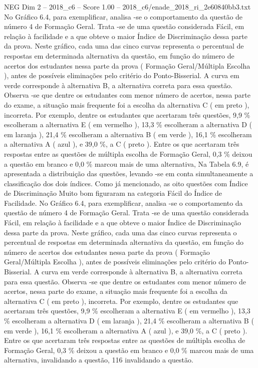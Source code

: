 \begin{textsample}{NEG Dim 2 – 2018\_c6 – Score 1.00 – 2018\_c6/enade\_2018\_ri\_2e60840bb3.txt}
No Gráfico 6.4, para exemplificar, analisa -se o comportamento da questão de número 4 de Formação Geral.
Trata -se de uma questão considerada Fácil, em relação à facilidade e a que obteve o maior Índice de Discriminação dessa parte da prova.
Neste gráfico, cada uma das cinco curvas representa o percentual de respostas em determinada alternativa da questão, em função do número de acertos dos estudantes nessa parte da prova ( Formação Geral/Múltipla Escolha ), antes de possíveis eliminações pelo critério do Ponto-Bisserial.
A curva em verde corresponde à alternativa B, a alternativa correta para essa questão.
Observa -se que dentre os estudantes com menor número de acertos, nessa parte do exame, a situação mais frequente foi a escolha da alternativa C ( em preto ), incorreta.
Por exemplo, dentre os estudantes que acertaram três questões, 9,9 \% escolheram a alternativa E ( em vermelho ), 13,3 \% escolheram a alternativa D ( em laranja ), 21,4 \% escolheram a alternativa B ( em verde ), 16,1 \% escolheram a alternativa A ( azul ), e 39,0 \%, a C ( preto ).
Entre os que acertaram três respostas entre as questões de múltipla escolha de Formação Geral, 0,3 \% deixou a questão em branco e 0,0 \% marcou mais de uma alternativa, Na Tabela 6.9, é apresentada a distribuição das questões, levando -se em conta simultaneamente a classificação dos dois índices.
Como já mencionado, as oito questões com Índice de Discriminação Muito bom figuraram na categoria Fácil do Índice de Facilidade.
No Gráfico 6.4, para exemplificar, analisa -se o comportamento da questão de número 4 de Formação Geral.
Trata -se de uma questão considerada Fácil, em relação à facilidade e a que obteve o maior Índice de Discriminação dessa parte da prova.
Neste gráfico, cada uma das cinco curvas representa o percentual de respostas em determinada alternativa da questão, em função do número de acertos dos estudantes nessa parte da prova ( Formação Geral/Múltipla Escolha ), antes de possíveis eliminações pelo critério do Ponto-Bisserial.
A curva em verde corresponde à alternativa B, a alternativa correta para essa questão.
Observa -se que dentre os estudantes com menor número de acertos, nessa parte do exame, a situação mais frequente foi a escolha da alternativa C ( em preto ), incorreta.
Por exemplo, dentre os estudantes que acertaram três questões, 9,9 \% escolheram a alternativa E ( em vermelho ), 13,3 \% escolheram a alternativa D ( em laranja ), 21,4 \% escolheram a alternativa B ( em verde ), 16,1 \% escolheram a alternativa A ( azul ), e 39,0 \%, a C ( preto ).
Entre os que acertaram três respostas entre as questões de múltipla escolha de Formação Geral, 0,3 \% deixou a questão em branco e 0,0 \% marcou mais de uma alternativa, invalidando a questão, 116 invalidando a questão.

\end{textsample}
